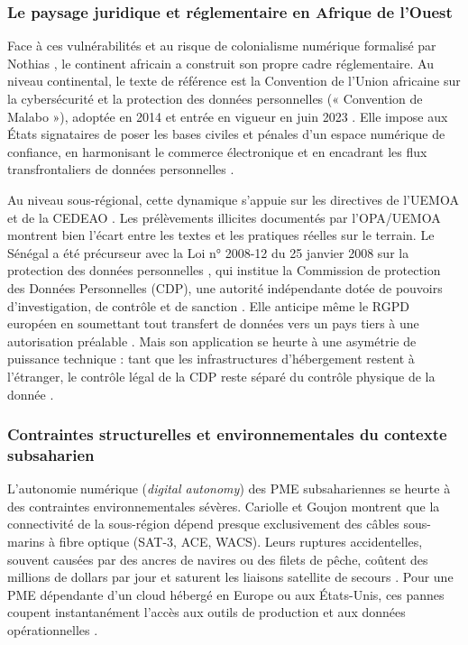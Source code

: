 \subsubsection{Le paysage juridique et réglementaire en Afrique de l'Ouest}

Face à ces vulnérabilités et au risque de colonialisme numérique formalisé par Nothias \cite{nothiasIntellectualHistoryDigital2025}, le continent africain a construit son propre cadre réglementaire. Au niveau continental, le texte de référence est la Convention de l'Union africaine sur la cybersécurité et la protection des données personnelles (« Convention de Malabo »), adoptée en 2014 et entrée en vigueur en juin 2023 \cite{uaConventionMalabo2014}. Elle impose aux États signataires de poser les bases civiles et pénales d'un espace numérique de confiance, en harmonisant le commerce électronique et en encadrant les flux transfrontaliers de données personnelles \cite{uaConventionMalabo2014}.

Au niveau sous-régional, cette dynamique s'appuie sur les directives de l'UEMOA et de la CEDEAO \cite{cariolleInfrastructuresEconomieNumeriques2018}. Les prélèvements illicites documentés par l'OPA/UEMOA montrent bien l'écart entre les textes et les pratiques réelles sur le terrain. Le Sénégal a été précurseur avec la Loi n° 2008-12 du 25 janvier 2008 sur la protection des données personnelles \cite{senegalLoi200812}, qui institue la Commission de protection des Données Personnelles (CDP), une autorité indépendante dotée de pouvoirs d'investigation, de contrôle et de sanction \cite{senegalLoi200812}. Elle anticipe même le RGPD européen en soumettant tout transfert de données vers un pays tiers à une autorisation préalable \cite{senegalLoi200812}. Mais son application se heurte à une asymétrie de puissance technique : tant que les infrastructures d'hébergement restent à l'étranger, le contrôle légal de la CDP reste séparé du contrôle physique de la donnée \cite{anssibsiCloudSovereignty2025}.

\subsubsection{Contraintes structurelles et environnementales du contexte subsaharien}

L'autonomie numérique (\textit{digital autonomy}) des PME subsahariennes se heurte à des contraintes environnementales sévères. Cariolle et Goujon \cite{cariolleInfrastructuresEconomieNumeriques2018} montrent que la connectivité de la sous-région dépend presque exclusivement des câbles sous-marins à fibre optique (SAT-3, ACE, WACS). Leurs ruptures accidentelles, souvent causées par des ancres de navires ou des filets de pêche, coûtent des millions de dollars par jour et saturent les liaisons satellite de secours \cite{cariolleInfrastructuresEconomieNumeriques2018}. Pour une PME dépendante d'un cloud hébergé en Europe ou aux États-Unis, ces pannes coupent instantanément l'accès aux outils de production et aux données opérationnelles \cite{cariolleInfrastructuresEconomieNumeriques2018}.

